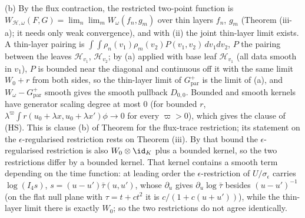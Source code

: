 (b) By the flux contraction, the restricted two-point function is $W_{\mathcal{H},\omega}(F, G) = \lim_{n}\lim_{m}W_{\omega}(f_{n}, g_{m})$ over thin layers $f_{n}$, $g_{m}$ (Theorem (iii-a); it needs only weak convergence), and with (ii) the joint thin-layer limit exists. A thin-layer pairing is $\int\int\rho_{n}(v_{1})\rho_{m}(v_{2})P(v_{1}, v_{2})\,dv_{1}dv_{2}$, $P$ the pairing between the leaves $\mathcal{H}_{v_{1}}$, $\mathcal{H}_{v_{2}}$; by (a) applied with base leaf $\mathcal{H}_{v_{1}}$ (all data smooth in $v_{1}$), $P$ is bounded near the diagonal and continuous off it with the same limit $W_{0} + r$ from both sides, so the thin-layer limit of $G^{+}_{\mathrm{par}}$ is the limit of (a), and $W_{\omega} - G^{+}_{\mathrm{par}}$ smooth gives the smooth pullback $D_{0,0}$. Bounded and smooth kernels have generator scaling degree at most $0$ (for bounded $r$, $\lambda^{\varpi}\int r(u_{0} + \lambda x, u_{0} + \lambda x')\phi \to 0$ for every $\varpi > 0$), which gives the clause of (HS). This is clause (b) of Theorem  for the flux-trace restriction; its statement on the $\epsilon$-regularised restriction rests on Theorem (iii). By that bound the $\epsilon$-regularised restriction is also $W_{0}\otimes\id_{K}$ plus a bounded kernel, so the two restrictions differ by a bounded kernel. That kernel contains a smooth term depending on the time function: at leading order the $\epsilon$-restriction of $U/\sigma_{\epsilon}$ carries $\log(I_{4} s)$, $s = (u - u')\bar\tau(u, u')$, whose $\partial_{u}$ gives $\partial_{u}\log\bar\tau$ besides $(u - u')^{-1}$ (on the flat null plane with $\tau = t + ct^{2}$ it is $c/(1 + c(u + u'))$), while the thin-layer limit there is exactly $W_{0}$; so the two restrictions do not agree identically.

